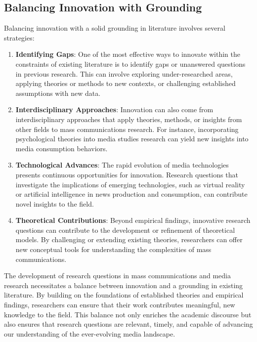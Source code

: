 \documentclass[
]{book}
\begin{document}
\hypertarget{balancing-innovation-with-grounding}{%
\subsection*{Balancing Innovation with Grounding}\label{balancing-innovation-with-grounding}}

Balancing innovation with a solid grounding in literature involves several strategies:

\begin{enumerate}
\def\labelenumi{\arabic{enumi}.}
\item
  \textbf{Identifying Gaps}: One of the most effective ways to innovate within the constraints of existing literature is to identify gaps or unanswered questions in previous research. This can involve exploring under-researched areas, applying theories or methods to new contexts, or challenging established assumptions with new data.
\item
  \textbf{Interdisciplinary Approaches}: Innovation can also come from interdisciplinary approaches that apply theories, methods, or insights from other fields to mass communications research. For instance, incorporating psychological theories into media studies research can yield new insights into media consumption behaviors.
\item
  \textbf{Technological Advances}: The rapid evolution of media technologies presents continuous opportunities for innovation. Research questions that investigate the implications of emerging technologies, such as virtual reality or artificial intelligence in news production and consumption, can contribute novel insights to the field.
\item
  \textbf{Theoretical Contributions}: Beyond empirical findings, innovative research questions can contribute to the development or refinement of theoretical models. By challenging or extending existing theories, researchers can offer new conceptual tools for understanding the complexities of mass communications.
\end{enumerate}

The development of research questions in mass communications and media research necessitates a balance between innovation and a grounding in existing literature. By building on the foundations of established theories and empirical findings, researchers can ensure that their work contributes meaningful, new knowledge to the field. This balance not only enriches the academic discourse but also ensures that research questions are relevant, timely, and capable of advancing our understanding of the ever-evolving media landscape.
\end{document}
